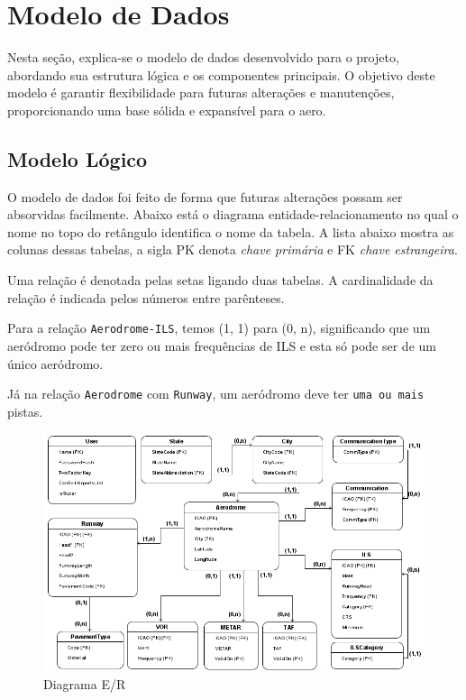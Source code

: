 \chapter{Modelo de Dados}

Nesta seção, explica-se o modelo de dados desenvolvido para o projeto, abordando sua estrutura 
lógica e os componentes principais. O objetivo deste modelo é garantir flexibilidade para futuras alterações e 
manutenções, proporcionando uma base sólida e expansível para o aero.

\section{Modelo Lógico}

O modelo de dados foi feito de forma que futuras alterações
possam ser absorvidas facilmente. Abaixo está o diagrama entidade-relacionamento no qual
o nome no topo do retângulo identifica o nome da tabela. A lista abaixo mostra
as colunas dessas tabelas, a sigla PK denota \textit{chave primária} e FK \textit{chave estrangeira}.

Uma relação é denotada pelas setas ligando duas tabelas. A cardinalidade da relação é indicada
pelos números entre parênteses. 

Para a relação \texttt{Aerodrome-ILS}, temos (1, 1) para (0, n), significando que um aeródromo pode
ter zero ou mais frequências de ILS e esta só pode ser de um único aeródromo.

Já na relação \texttt{Aerodrome} com \texttt{Runway}, um aeródromo deve ter \texttt{uma ou mais} pistas.

\pagebreak

\begin{figure}[ht]
    \begin{center}
    \includegraphics[width=400pt]{img/ERAero.png}
    \caption{Diagrama E/R}
    \label{fig:diagrama-er}
    \end{center}
\end{figure}

